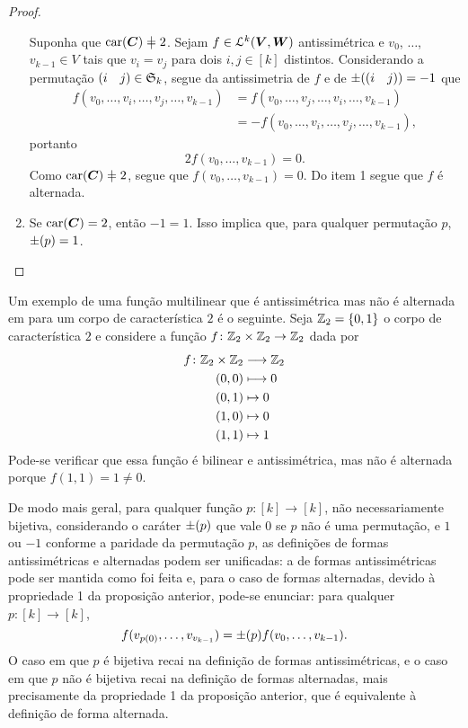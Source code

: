 \begin{proof}
\begin{enumerate}
Suponha que $\car(\bm C) \neq 2$. Sejam $f \in \mathcal{L}^k(\bm V,\bm W)$ antissimétrica e $v_0$, $\ldots$, $v_{k-1} \in V$ tais que $v_i = v_j$ para dois $i,j \in [k]$ distintos. Considerando a permutação $(i \quad j) \in \mathfrak{S}_k$, segue da antissimetria de $f$ e de $\mathord{\pm}((i \quad j))=-1$ que
	\begin{align*}
	f(v_0,\ldots,v_i,\ldots,v_j,\ldots,v_{k-1}) &= f(v_0,\ldots,v_j,\ldots,v_i,\ldots,v_{k-1}) \\
		&= - f(v_0,\ldots,v_i,\ldots,v_j,\ldots,v_{k-1}),
	\end{align*}
portanto
	\begin{equation*}
	2 f(v_0,\ldots,v_{k-1})=0.
	\end{equation*}
Como $\car(\bm C) \neq 2$, segue que $f(v_0,\ldots,v_{k-1})=0$. Do item 1 segue que $f$ é alternada.

\item Se $\operatorname{car}(\bm C) = 2$, então $-1=1$. Isso implica que, para qualquer permutação $p$, $\mathord{\pm}(p)=1$.
\end{enumerate}
\end{proof}

Um exemplo de uma função multilinear que é antissimétrica mas não é alternada em para um corpo de característica $2$ é o seguinte. Seja $\mathbb{Z}_2=\{0,1\}$ o corpo de característica $2$ e considere a função $f\colon \mathbb{Z}_2 \times \mathbb{Z}_2 \to \mathbb{Z}_2$ dada por
	\begin{align*}
	\func{f}{\Z_2 \times \Z_2}{\Z_2}{(0,0)}{0 \\
															(0,1) &\mapsto 0 \\
															(1,0) &\mapsto 0 \\
															(1,1) &\mapsto 1
														}
	\end{align*}
Pode-se verificar que essa função é bilinear e antissimétrica, mas não é alternada porque $f(1,1)=1 \neq 0$.

De modo mais geral, para qualquer função $p\colon [k] \to [k]$, não necessariamente bijetiva, considerando o caráter $\mathord{\pm}(p)$ que vale $0$ se $p$ não é uma permutação, e $1$ ou $-1$ conforme a paridade da permutação $p$, as definições de formas antissimétricas e alternadas podem ser unificadas: a de formas antissimétricas pode ser mantida como foi feita e, para o caso de formas alternadas, devido à propriedade 1 da proposição anterior, pode-se enunciar: para qualquer $p\colon [k] \to [k]$,
	\begin{equation*}
	f(v_{p(0)},\ldots,v_{v_{k-1}}) = \mathord{\pm}(p) f(v_0,\ldots,v_{k-1}).
	\end{equation*}
O caso em que $p$ é bijetiva recai na definição de formas antissimétricas, e o caso em que $p$ não é bijetiva recai na definição de formas alternadas, mais precisamente da propriedade 1 da proposição anterior, que é equivalente à definição de forma alternada.

